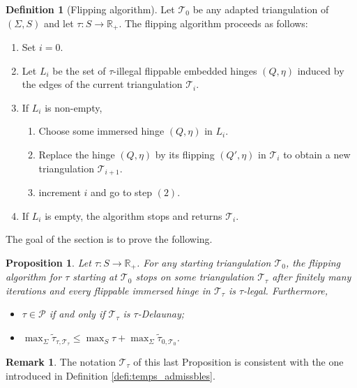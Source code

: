 \documentclass[a4paper,12pt]{article}
\def\TT{\mathcal T}
\def\adm{\P}
\def\RR{\mathbb{R}}
\def\adm{\mathcal{P}}
\def\P{\mathcal{P}}
\newcommand{\tautilde}[2]{\widetilde\tau_{#1,#2}}
\newtheorem{prop}[lem]{Proposition}
\theoremstyle{definition}
\newtheorem{defi}[lem]{Definition}	%
\newtheorem*{rem}{Remark}			 %
\begin{document}
						
						\begin{defi}[Flipping algorithm]\label{def:flipping_algorithm}
							Let $\TT_0$ be any adapted triangulation of $(\Sigma, S)$ and let $\tau: S \rightarrow \RR_+$.
							The flipping algorithm proceeds as follows:
								\begin{enumerate}
								\item Set $i=0$.
								\item Let $L_i$ be the set of $\tau$-illegal flippable embedded hinges $(Q,\eta)$ induced by the edges of the current triangulation $\TT_i$.
								\item If $L_i$ is non-empty,
									\begin{enumerate}
										\item Choose some immersed hinge $(Q,\eta)$ in $L_i$.
										\item Replace the hinge $(Q,\eta)$ by its flipping $(Q',\eta)$ in $\TT_i$ to obtain a new
										triangulation $\TT_{i+1}$.
										\item increment $i$ and go to step $(2)$.
									\end{enumerate}
								\item If $L_i$ is empty, the algorithm stops and returns $\TT_i$.
							 \end{enumerate}
						\end{defi}
						The goal of the section is to prove the following.
						\begin{prop} \label{prop:algo_stop}
						 Let $\tau: S\rightarrow \RR_+$.
						 For any starting triangulation $\TT_0$, the flipping algorithm for $\tau$ starting at $\TT_0$
						 stops on some triangulation $\TT_\tau$ after finitely many iterations and every flippable immersed hinge in $\TT_\tau$ is $\tau$-legal. 
						 Furthermore, 
						 
						 \begin{itemize}
						 \item $\tau\in \adm$ if and only if $\TT_\tau$ is $\tau$-Delaunay;
						 \item $\displaystyle\max_\Sigma\tautilde{\tau}{\TT_\tau}\leq \max_S \tau + \max_\Sigma \tautilde{0}{\TT_0}$.
						 \end{itemize}
						\end{prop}
						\begin{rem}\label{rem:notation_last_proposition_consistent} The notation $\TT_\tau$ of this last Proposition is consistent with the one introduced in Definition \ref{defi:temps_admissbles}.
						 
						\end{rem}
\end{document}
